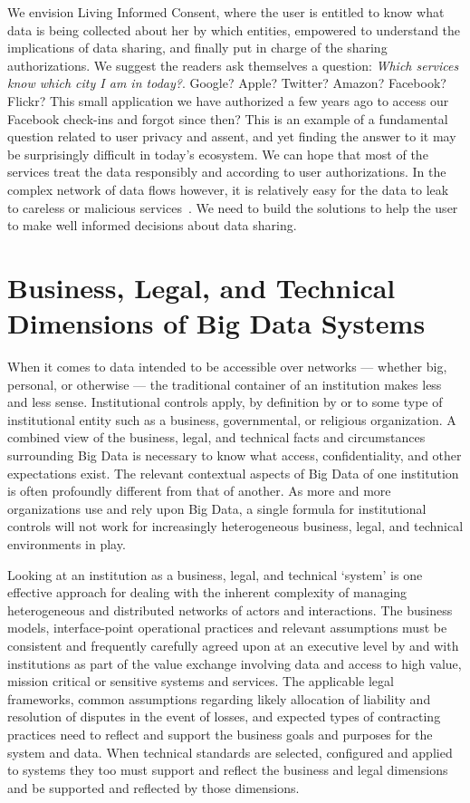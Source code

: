 We envision Living Informed Consent, where the user is entitled to know what data is being collected about her by which entities, empowered to understand the implications of data sharing, and finally put in charge of the sharing authorizations.
We suggest the readers ask themselves a question: \emph{Which services know which city I am in today?}.
Google? Apple? Twitter? Amazon? Facebook? Flickr?
This small application we have authorized a few years ago to access our Facebook check-ins and forgot since then? 
This is an example of a fundamental question related to user privacy and assent, and yet finding the answer to it may be surprisingly difficult in today's ecosystem.
We can hope that most of the services treat the data responsibly and according to user authorizations.
In the complex network of data flows however, it is relatively easy for the data to leak to  careless or malicious services~\cite{biltongirls}.
We need to build the solutions to help the user to make well informed decisions about data sharing.



\section{Business, Legal, and Technical Dimensions of Big Data Systems }

When it comes to data intended to be accessible over networks --- whether big, personal, or otherwise --- the traditional container of an institution makes less and less sense.
Institutional controls apply, by definition by or to some type of institutional entity such as a business, governmental, or religious organization.
A combined view of the business, legal, and technical facts and circumstances surrounding Big Data is necessary to know what access, confidentiality, and other expectations exist.
The relevant contextual aspects of Big Data of one institution is often profoundly different from that of another.
As more and more organizations use and rely upon Big Data, a single formula for institutional controls will not work for increasingly heterogeneous business, legal, and technical environments in play.

Looking at an institution as a business, legal, and technical `system' is one effective approach for dealing with the inherent complexity of managing heterogeneous and distributed networks of actors and interactions.
The business models, interface-point operational practices and relevant assumptions must be consistent and frequently carefully agreed upon at an executive level by and with institutions as part of the value exchange involving data and access to high value, mission critical or sensitive systems and services.
The applicable legal frameworks, common assumptions regarding likely allocation of liability and resolution of disputes in the event of losses, and expected types of contracting practices need to reflect and support the business goals and purposes for the system and data.
When technical standards are selected, configured and applied to systems they too must support and reflect the business and legal dimensions and be supported and reflected by those dimensions.

